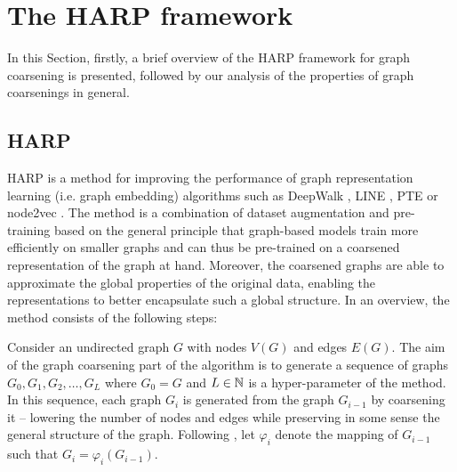 \section{The HARP framework}\label{sec:harp-framework}

In this Section, firstly, a brief overview of the HARP framework for graph coarsening \cite{chen_harp_2018} is presented, followed by our analysis of the properties of graph coarsenings in general.

\subsection{HARP}\label{sec:harp}
HARP is a method for improving the performance of graph representation learning (i.e. graph embedding) algorithms such as DeepWalk \cite{perozzi_deepwalk_2014}, LINE \cite{tang_line_2015}, PTE \cite{tang_pte_2015} or node2vec \cite{grover_node2vec_2016}. The method is a combination of dataset augmentation and pre-training based on the general principle that graph-based models train more efficiently on smaller graphs and can thus be pre-trained on a coarsened representation of the graph at hand. Moreover, the coarsened graphs are able to approximate the global properties of the original data, enabling the representations to better encapsulate such a global structure. In an overview, the method consists of the following steps:

Consider an undirected graph \( G \) with nodes \( V \left( G \right) \) and edges \( E \left( G \right) \). The aim of the graph coarsening part of the algorithm is to generate a sequence of graphs \( G_0, G_1, G_2, \dots, G_L \) where \( G_0 = G \) and \( L \in \mathbb{N} \) is a hyper-parameter of the method. In this sequence, each graph \( G_i \) is generated from the graph \( G_{i - 1} \) by coarsening it -- lowering the number of nodes and edges while preserving in some sense the general structure of the graph. Following \cite{chen_harp_2018}, let \( \varphi_i \) denote the mapping of \( G_{i - 1} \) such that \( G_i = \varphi_i \left( G_{i - 1} \right) \).

